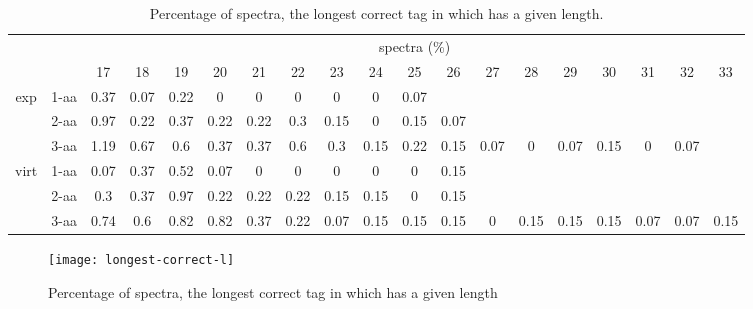 \documentclass{article}[12pt]
\begin{document}
\begin{landscape}
\begin{table}[h]\tiny
\vspace{3mm}
{\centering
\begin{center}
\begin{tabular}{|c|l|c|c|c|c|c|c|c|c|c|c|c|c|c|c|c|c|c|}
  \hline
  \multicolumn{2}{|c|}{ } & \multicolumn{ 17 }{|c|}{ spectra (\%)} \\
  \cline{3- 19}
  \multicolumn{2}{|c|}{ }  & 17 & 18 & 19 & 20 & 21 & 22 & 23 & 24 & 25 & 26 & 27 & 28 & 29 & 30 & 31 & 32 & 33\\
  \hline
  \multirow{3}{*}{exp}
&  1-aa  & 0.37 & 0.07 & 0.22 & 0 & 0 & 0 & 0 & 0 & 0.07 &  &  &  &  &  &  &  & \\
&  2-aa  & 0.97 & 0.22 & 0.37 & 0.22 & 0.22 & 0.3 & 0.15 & 0 & 0.15 & 0.07 &  &  &  &  &  &  & \\
&  3-aa  & 1.19 & 0.67 & 0.6 & 0.37 & 0.37 & 0.6 & 0.3 & 0.15 & 0.22 & 0.15 & 0.07 & 0 & 0.07 & 0.15 & 0 & 0.07 & \\
 \hline
  \multirow{3}{*}{virt} 
&  1-aa  & 0.07 & 0.37 & 0.52 & 0.07 & 0 & 0 & 0 & 0 & 0 & 0.15 &  &  &  &  &  &  & \\
&  2-aa  & 0.3 & 0.37 & 0.97 & 0.22 & 0.22 & 0.22 & 0.15 & 0.15 & 0 & 0.15 &  &  &  &  &  &  & \\
&  3-aa  & 0.74 & 0.6 & 0.82 & 0.82 & 0.37 & 0.22 & 0.07 & 0.15 & 0.15 & 0.15 & 0 & 0.15 & 0.15 & 0.15 & 0.07 & 0.07 & 0.15\\
 \hline
\end{tabular}
\end{center}
\par}
\centering
\caption{ Percentage of spectra, the longest correct tag in which has a given length.}
\label{table:longest-correct-l}
\vspace{3mm}
\end{table}

\end{landscape}

\begin{figure}
  \begin{center}
\texttt{[image: longest-correct-l]}
\end{center}
\caption{Percentage of spectra, the longest correct tag in which has a given length}
  \label{fig:longest-correct-l}
\end{figure}
\end{document}
